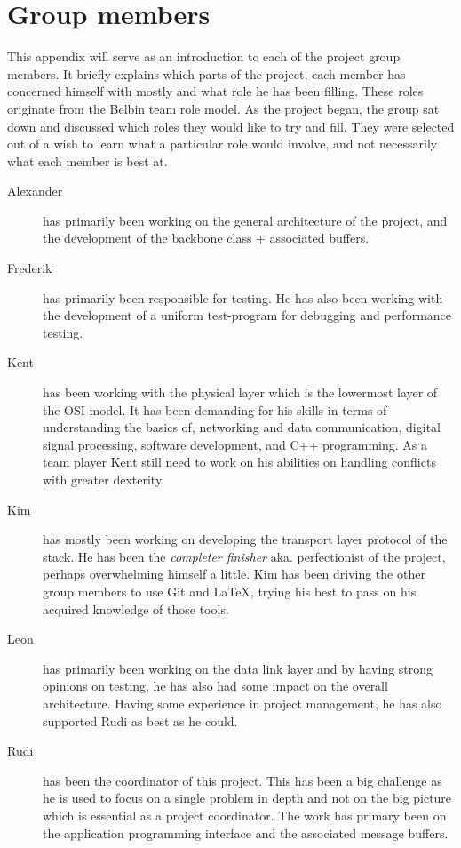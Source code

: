 \chapter{Group members}\label{app:members}
This appendix will serve as an introduction to each of the project group
members. It briefly explains which parts of the project, each member has
concerned himself with mostly and what role he has been filling. These roles
originate from the Belbin team role model. As the project began, the group sat
down and discussed which roles they would like to try and fill. They were
selected out of a wish to learn what a particular role would involve, and not
necessarily what each member is best at.

\begin{description}
\item[Alexander] has primarily been working on the general architecture of the
project, and the development of the backbone class + associated buffers.
\item[Frederik] has primarily been responsible for testing. He has also been
working with the development of a uniform test-program for debugging and
performance testing.
\item[Kent] has been working with the physical layer which is the lowermost
layer of the OSI-model. It has been demanding for his skills in terms of understanding the basics of, networking and data communication, digital signal processing, software development, and C++ programming. As a team player Kent still need to work on his abilities on handling conflicts with greater dexterity.
\item[Kim] has mostly been working on developing the transport layer protocol of the stack. He has been the \textit{completer finisher} aka. perfectionist of the project, perhaps overwhelming himself a little. Kim has been driving the other group members to use Git and \LaTeX, trying his best to pass on his acquired knowledge of those tools.
\item[Leon] has primarily been working on the data link layer and by having
strong opinions on testing, he has also had some impact on the
overall architecture. Having some experience in project management, he has also
supported Rudi as best as he could.
\item[Rudi] has been the coordinator of this project. This has been a big
challenge as he is used to focus on a single problem in depth and not on the
big picture which is essential as a project coordinator. The work has primary been on the application programming interface and the associated message buffers.
\end{description}